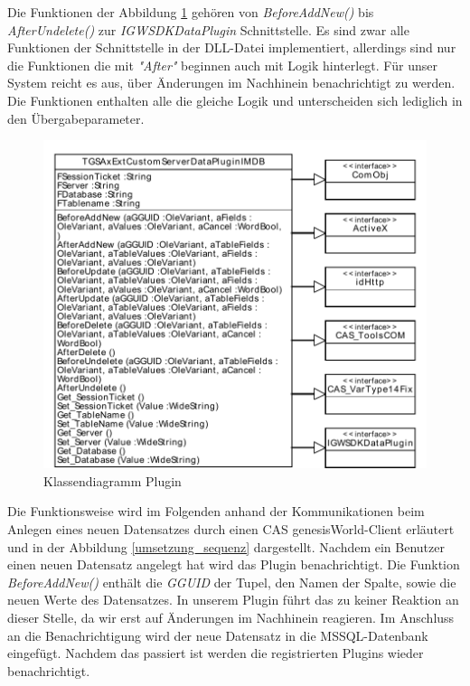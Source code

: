 Die Funktionen der Abbildung \ref{ergebniss_plugin_klassendiagramm} gehören von \textit{BeforeAddNew()} bis \textit{AfterUndelete()} zur \textit{IGWSDKDataPlugin} Schnittstelle. Es sind zwar alle Funktionen der Schnittstelle in der DLL-Datei implementiert, allerdings sind nur die Funktionen die mit \textit{"After"} beginnen auch mit Logik hinterlegt. Für unser System reicht es aus, über Änderungen im Nachhinein benachrichtigt zu werden. Die Funktionen enthalten alle die gleiche Logik und unterscheiden sich lediglich in den Übergabeparameter.

\begin{figure}[htbp]
\centering
\includegraphics[scale=0.7]{pics/plugin_klassendiagramm.pdf}
\caption{Klassendiagramm Plugin}
\label{ergebniss_plugin_klassendiagramm}
\end{figure}

Die Funktionsweise wird im Folgenden anhand der Kommunikationen beim Anlegen eines neuen Datensatzes durch einen CAS genesisWorld-Client erläutert und in der Abbildung \ref{umsetzung_sequenz} dargestellt. Nachdem ein Benutzer einen neuen Datensatz angelegt hat wird das Plugin benachrichtigt. Die Funktion \textit{BeforeAddNew()} enthält die \textit{GGUID} der Tupel, den Namen der Spalte, sowie die neuen Werte des Datensatzes. In unserem Plugin führt das zu keiner Reaktion an dieser Stelle, da wir erst auf Änderungen im Nachhinein reagieren. Im Anschluss an die Benachrichtigung wird der neue Datensatz in die MSSQL-Datenbank eingefügt. Nachdem das passiert ist werden die registrierten Plugins wieder benachrichtigt.

